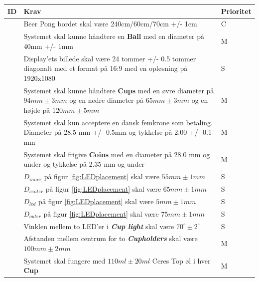 \documentclass[Kravspecifikation/Kravspec_Main.tex]{subfiles}
\begin{document}
\begin{table}[H]
\centering
\begin{tabular}{|L{0.1\textwidth}|L{0.6\textwidth}|L{0.15\textwidth}|}
\hline
\textbf{ID} & \textbf{Krav} & \textbf{Prioritet} \\ \hline
\subreq{} \label{req:table-dimensions} & Beer Pong bordet skal være 240cm/60cm/70cm +/- 1cm  &  C\\ \hline
\subreq{} \label{req:ball-size} & Systemet skal kunne håndtere en \textbf{Ball} med en diameter på 40mm +/- 1mm & M  \\ \hline
\subreq{} \label{req:display-size} & Display'ets billede skal være 24 tommer +/- 0.5 tommer diagonalt med et format på 16:9 med en opløsning på 1920x1080& S \\ \hline
\subreq{} \label{req:cup-size} & Systemet skal kunne håndtere \textbf{Cups} med en øvre diameter på $94\si{mm} \pm 3\si{mm}$ og en nedre diameter på $65\si{mm} \pm 3\si{mm}$ og en højde på $120mm \pm{5mm}$ & M\\ \hline
\subreq{} \label{req:coin-size} & Systemet skal kun acceptere en dansk femkrone\autocite{fiveKrCoin} som betaling. Diameter på 28.5 mm +/- 0.5mm og tykkelse på 2.00 +/- 0.1 mm & M\\ \hline
\subreq{} \label{req:coin-max-size}& Systemet skal frigive \textbf{Coins} med en diameter på 28.0 mm og under og tykkelse på 2.35 mm og under & M\\ \hline
\subreq{} \label{req:light-D-inner}& $D_{inner}$ på figur \ref{fig:LEDplacement} skal være $55\si{mm} \pm 1\si{mm}$  & S \\ \hline
\subreq{} \label{req:light-D-center}& $D_{center}$ på figur \ref{fig:LEDplacement} skal være $65\si{mm} \pm 1\si{mm}$  & S \\ \hline
\subreq{} \label{req:light-D-led} & $D_{led}$ på figur \ref{fig:LEDplacement} skal være $5\si{mm} \pm 1\si{mm}$  & S \\ \hline
\subreq{} \label{req:light-D-outer}& $D_{outer}$ på figur \ref{fig:LEDplacement} skal være $75\si{mm} \pm 1\si{mm}$   & S \\ \hline
\subreq{} \label{req:light-led-angle}& Vinklen mellem to LED'er i \textit{\textbf{Cup light}} skal være $70^{\circ} \pm 2^{\circ}$ & S \\ \hline
\subreq{} \label{req:cup-holder-distance} & Afstanden mellem centrum for to \textit{\textbf{Cupholders}} skal være $100\si{mm} \pm 2\si{mm}$ & M \\ \hline
\subreq{} \label{req:beer-amount}& Systemet skal fungere med $110\si{ml} \pm 20\si{ml}$ Ceres Top øl i hver \textbf{Cup} & M\\ \hline

\end{tabular}
\end{table}
\end{document}

